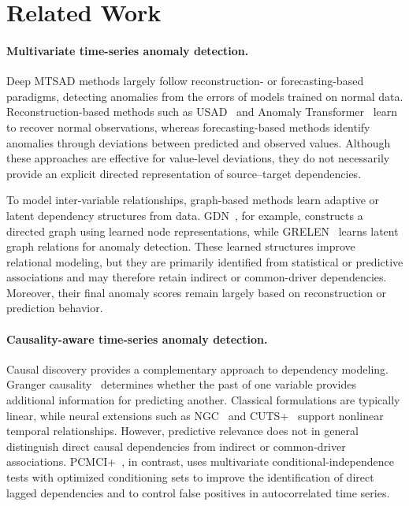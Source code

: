 \documentclass[letterpaper]{article}
\begin{document}
\section{Related Work}

\paragraph{Multivariate time-series anomaly detection.}
Deep MTSAD methods largely follow reconstruction- or forecasting-based paradigms, detecting anomalies from the errors of models trained on normal data. Reconstruction-based methods such as USAD~\cite{audibert2020usad} and Anomaly Transformer~\cite{xu2022anomaly} learn to recover normal observations, whereas forecasting-based methods identify anomalies through deviations between predicted and observed values. Although these approaches are effective for value-level deviations, they do not necessarily provide an explicit directed representation of source--target dependencies.

To model inter-variable relationships, graph-based methods learn adaptive or latent dependency structures from data. GDN~\cite{deng2021gdn}, for example, constructs a directed graph using learned node representations, while GRELEN~\cite{zhang2022grelen} learns latent graph relations for anomaly detection. These learned structures improve relational modeling, but they are primarily identified from statistical or predictive associations and may therefore retain indirect or common-driver dependencies. Moreover, their final anomaly scores remain largely based on reconstruction or prediction behavior.

\paragraph{Causality-aware time-series anomaly detection.}
Causal discovery provides a complementary approach to dependency modeling. Granger causality~\cite{granger1969} determines whether the past of one variable provides additional information for predicting another. Classical formulations are typically linear, while neural extensions such as NGC~\cite{tank2021ngc} and CUTS+~\cite{cheng2024cutsplus} support nonlinear temporal relationships. However, predictive relevance does not in general distinguish direct causal dependencies from indirect or common-driver associations. PCMCI+~\cite{runge2020pcmciplus}, in contrast, uses multivariate conditional-independence tests with optimized conditioning sets to improve the identification of direct lagged dependencies and to control false positives in autocorrelated time series.
\end{document}
